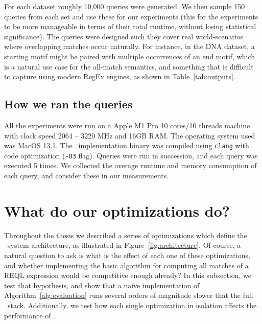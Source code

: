 For each dataset roughly 10,000 queries were generated. We then sample 150
queries from each set and use these for our experiments (this for the
experiments to be more manageable in terms of their total runtime, without
losing statistical significance). The queries were designed such they cover real
world-scenarios where overlapping matches occur naturally. For instance, in the
\textsf{DNA} dataset, a starting motif might be paired with multiple occurrences
of an end motif, which is a natural use case for the all-match semantics, and
something that is difficult to capture using modern RegEx engines, as shown in
Table~\ref{tab:outputs}. 


\subsection{How we ran the queries}
All the experiments were run on a Apple M1 Pro 10 cores/10 threads machine with
clock speed 2064 -- 3220 MHz and 16GB RAM. The operating system used was MacOS
13.1.   The \rematch\ implementation binary was compiled using \texttt{clang}
with code optimization (\texttt{-O3} flag). Queries were run in succession, and
each query was executed 5 times. We collected the average runtime and memory
consumption of each query, and consider these in our measurements.

\section{What do our optimizations do?}\label{ss:internal} Throughout the thesis
we described a series of optimizations which define the \rematch\ system
architecture, as illustrated in Figure~\ref{fig:architecture}. Of course, a
natural question to ask is what is the effect of each one of these
optimizations, and whether implementing the basic algorithm for computing all
matches of a REQL expression  would be competitive enough already? In this
subsection, we test that hypothesis, and show that a naive implementation of
Algorithm~\ref{alg:evaluation} runs several orders of magnitude slower that the
full \rematch\ stack. Additionally, we test how each single optimization in
isolation affects the performance of \rematch.




